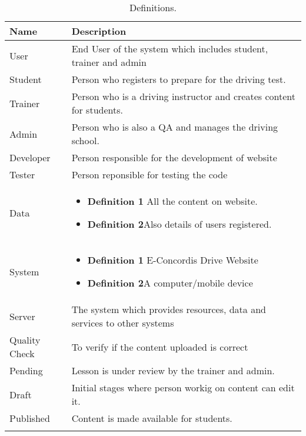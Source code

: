 \documentclass{article}
\begin{document}
\begin{longtable}{|p{4.5cm}|p{6.5cm}|}\hline
    \textbf{Name} & \textbf{Description}  \\ \hline
         User& End User of the system which includes student, trainer and admin\\ \hline
         Student& Person who registers to prepare for the driving test.\\ \hline
         Trainer& Person who is a driving instructor and creates content for students.\\ \hline
         Admin& Person who is also a QA and manages the driving school.\\ \hline
         Developer& Person responsible for the development of website\\ \hline
         Tester& Person reponsible for testing the code\\ \hline
         Data& \begin{itemize}
             \item \textbf{Definition 1} All the content on website.
             \item \textbf{Definition 2}Also details of users registered.
         \end{itemize}\\ \hline
         System& \begin{itemize}
             \item \textbf{Definition 1} E-Concordis Drive Website
             \item \textbf{Definition 2}A computer/mobile device
         \end{itemize}\\ \hline
         Server& The system which provides resources, data and services to other systems\\ \hline
         Quality Check & To verify if the content uploaded is correct\\ \hline
         Pending& Lesson is under review by the trainer and admin.\\ \hline
         Draft& Initial stages where person workig on content can edit it.\\ \hline
         Published& Content is made available for students.\\ \hline
         \caption{Definitions.\label{long}}\\
\end{longtable}
\end{document}
